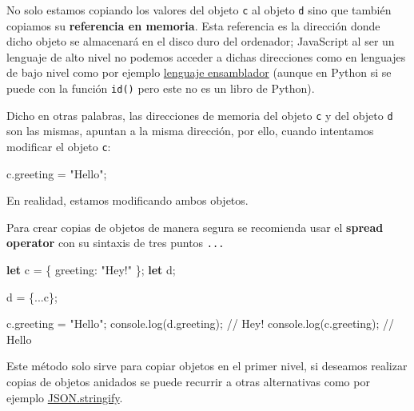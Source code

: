 \documentclass[
  letterpaper,
  DIV=11,
  numbers=noendperiod]{scrreprt}
\newenvironment{Shaded}{\begin{snugshade}}{\end{snugshade}}
\newcommand{\AttributeTok}[1]{\textcolor[rgb]{0.40,0.45,0.13}{#1}}
\newcommand{\BuiltInTok}[1]{\textcolor[rgb]{0.00,0.23,0.31}{#1}}
\newcommand{\CommentTok}[1]{\textcolor[rgb]{0.37,0.37,0.37}{#1}}
\newcommand{\DataTypeTok}[1]{\textcolor[rgb]{0.68,0.00,0.00}{#1}}
\newcommand{\FunctionTok}[1]{\textcolor[rgb]{0.28,0.35,0.67}{#1}}
\newcommand{\KeywordTok}[1]{\textcolor[rgb]{0.00,0.23,0.31}{\textbf{#1}}}
\newcommand{\NormalTok}[1]{\textcolor[rgb]{0.00,0.23,0.31}{#1}}
\newcommand{\OperatorTok}[1]{\textcolor[rgb]{0.37,0.37,0.37}{#1}}
\newcommand{\StringTok}[1]{\textcolor[rgb]{0.13,0.47,0.30}{#1}}
\begin{document}
No solo estamos copiando los valores del objeto \texttt{c} al objeto
\texttt{d} sino que también copiamos su \textbf{referencia en memoria}.
Esta referencia es la dirección donde dicho objeto se almacenará en el
disco duro del ordenador; JavaScript al ser un lenguaje de alto nivel no
podemos acceder a dichas direcciones como en lenguajes de bajo nivel
como por ejemplo \hyperref[glos-lenguaje_ensamblador]{lenguaje
ensamblador} (aunque en Python si se puede con la función \texttt{id()}
pero este no es un libro de Python).

Dicho en otras palabras, las direcciones de memoria del objeto
\texttt{c} y del objeto \texttt{d} son las mismas, apuntan a la misma
dirección, por ello, cuando intentamos modificar el objeto \texttt{c}:

\begin{Shaded}
\begin{Highlighting}[]
\NormalTok{c}\OperatorTok{.}\AttributeTok{greeting} \OperatorTok{=} \StringTok{"Hello"}\OperatorTok{;}
\end{Highlighting}
\end{Shaded}

En realidad, estamos modificando ambos objetos.

Para crear copias de objetos de manera segura se recomienda usar el
\textbf{spread operator} con su sintaxis de tres puntos \texttt{...}

\begin{Shaded}
\begin{Highlighting}[]
\KeywordTok{let}\NormalTok{ c }\OperatorTok{=}\NormalTok{ \{ }\DataTypeTok{greeting}\OperatorTok{:} \StringTok{"Hey!"}\NormalTok{ \}}\OperatorTok{;}
\KeywordTok{let}\NormalTok{ d}\OperatorTok{;}

\NormalTok{d }\OperatorTok{=}\NormalTok{ \{}\OperatorTok{...}\NormalTok{c\}}\OperatorTok{;}

\NormalTok{c}\OperatorTok{.}\AttributeTok{greeting} \OperatorTok{=} \StringTok{"Hello"}\OperatorTok{;}
\BuiltInTok{console}\OperatorTok{.}\FunctionTok{log}\NormalTok{(d}\OperatorTok{.}\AttributeTok{greeting}\NormalTok{)}\OperatorTok{;} \CommentTok{// Hey!}
\BuiltInTok{console}\OperatorTok{.}\FunctionTok{log}\NormalTok{(c}\OperatorTok{.}\AttributeTok{greeting}\NormalTok{)}\OperatorTok{;} \CommentTok{// Hello}
\end{Highlighting}
\end{Shaded}

Este método solo sirve para copiar objetos en el primer nivel, si
deseamos realizar copias de objetos anidados se puede recurrir a otras
alternativas como por ejemplo
\hyperref[glos-json_stringify]{JSON.stringify}.
\end{document}

